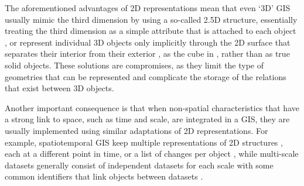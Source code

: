 The aforementioned advantages of 2D representations mean that even `3D' GIS usually mimic the third dimension by using a so-called 2.5D structure, essentially treating the third dimension as a simple attribute that is attached to each object \citep{Raper89}, or represent individual 3D objects only implicitly through the 2D surface that separates their interior from their exterior \citep{Edmonds60,Baumgart75}, as the cube in , rather than as true solid objects.
These solutions are compromises, as they limit the type of geometries that can be represented and complicate the storage of the relations that exist between 3D objects.


Another important consequence is that when non-spatial characteristics that have a strong link to space, such as time and scale, are integrated in a GIS, they are usually implemented using similar adaptations of 2D representations.
For example, spatiotemporal GIS keep multiple representations of 2D structures \citep{Armstrong88}, each at a different point in time, or a list of changes per object \citep{Worboys92,Peuquet94}, while multi-scale datasets generally consist of independent datasets for each scale with some common identifiers that link objects between datasets \citep{Friis-Christensen03,Stoter14}.

